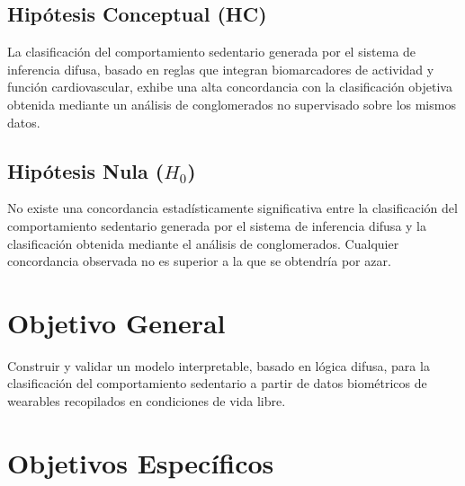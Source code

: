 \subsection{Hipótesis Conceptual (HC)}
\label{subsec:hipotesis_conceptual}

La clasificación del comportamiento sedentario generada por el sistema de inferencia difusa, basado en reglas que integran biomarcadores de actividad y función cardiovascular, exhibe una alta concordancia con la clasificación objetiva obtenida mediante un análisis de conglomerados no supervisado sobre los mismos datos.

\subsection{Hipótesis Nula ($H_0$)}
\label{subsec:hipotesis_nula}

No existe una concordancia estadísticamente significativa entre la clasificación del comportamiento sedentario generada por el sistema de inferencia difusa y la clasificación obtenida mediante el análisis de conglomerados. Cualquier concordancia observada no es superior a la que se obtendría por azar.

\section{Objetivo General}
\label{sec:objetivo_general}

Construir y validar un modelo interpretable, basado en lógica difusa, para la clasificación del comportamiento sedentario a partir de datos biométricos de wearables recopilados en condiciones de vida libre.

\section{Objetivos Específicos}
\label{sec:objetivos_especificos}

